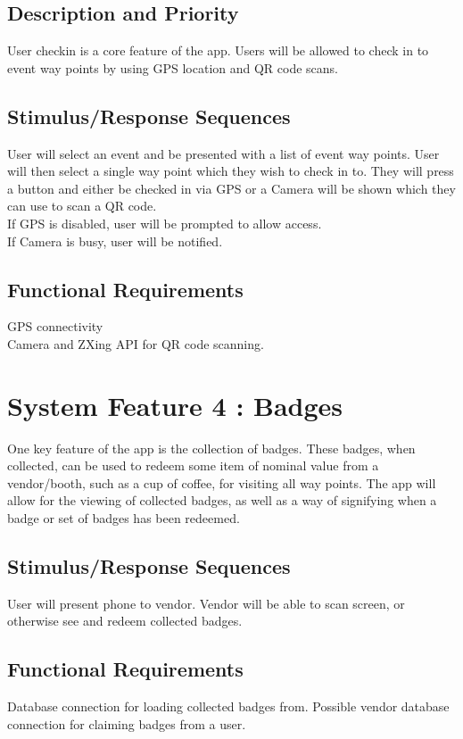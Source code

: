 \documentclass{scrreprt}
\begin{document}
\subsection{Description and Priority}
User checkin is a core feature of the app. Users will be allowed to check in to event way points
by using GPS location and QR code scans.

\subsection{Stimulus/Response Sequences}
User will select an event and be presented with a list of event way points. User will then
select a single way point which they wish to check in to. They will press a button and either
be checked in via GPS or a Camera will be shown which they can use to scan a QR code. \\
If GPS is disabled, user will be prompted to allow access. \\
If Camera is busy, user will be notified.

\subsection{Functional Requirements}
GPS connectivity \\
Camera and ZXing API for QR code scanning.

\section{System Feature 4 : Badges}
One key feature of the app is the collection of badges. These badges, when collected,
can be used to redeem some item of nominal value from a vendor/booth, such as a
cup of coffee, for visiting all way points. The app will allow for the viewing of collected
badges, as well as a way of signifying when a badge or set of badges has been redeemed.

\subsection{Stimulus/Response Sequences}
User will present phone to vendor. Vendor will be able to scan screen, or otherwise
see and redeem collected badges.

\subsection{Functional Requirements}
Database connection for loading collected badges from. Possible vendor database connection
for claiming badges from a user.
\end{document}
